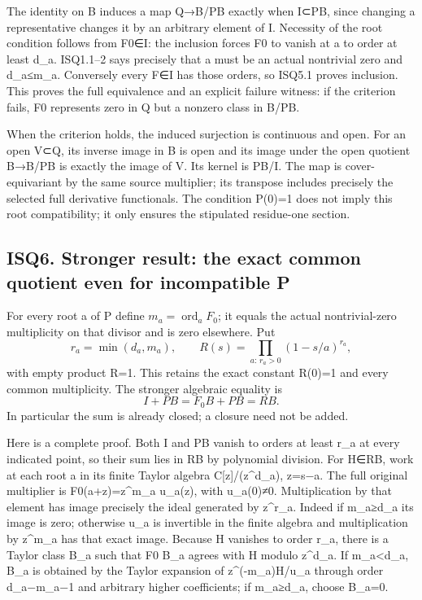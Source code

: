 \documentclass[
]{article}
\begin{document}
The identity on B induces a map Q→B/PB exactly when I⊂PB, since changing a representative changes it by an arbitrary element of I. Necessity of the root condition follows from F0∈I: the inclusion forces F0 to vanish at a to order at least d\_a. ISQ1.1--2 says precisely that a must be an actual nontrivial zero and d\_a≤m\_a. Conversely every F∈I has those orders, so ISQ5.1 proves inclusion. This proves the full equivalence and an explicit failure witness: if the criterion fails, F0 represents zero in Q but a nonzero class in B/PB.

When the criterion holds, the induced surjection is continuous and open. For an open V⊂Q, its inverse image in B is open and its image under the open quotient B→B/PB is exactly the image of V. Its kernel is PB/I. The map is cover-equivariant by the same source multiplier; its transpose includes precisely the selected full derivative functionals. The condition P(0)=1 does not imply this root compatibility; it only ensures the stipulated residue-one section.

\subsection{ISQ6. Stronger result: the exact common quotient even for incompatible P}\label{isq6.-stronger-result-the-exact-common-quotient-even-for-incompatible-p}

For every root a of P define \(m_a=\operatorname{ord}_aF_0\); it equals the actual nontrivial-zero multiplicity on that divisor and is zero elsewhere. Put \[
r_a=\min(d_a,m_a),\qquad
R(s)=\prod_{a:\,r_a>0}(1-s/a)^{r_a},
\tag{ISQ6.1}
\] with empty product R=1. This retains the exact constant R(0)=1 and every common multiplicity. The stronger algebraic equality is \[
\boxed{I+PB=F_0B+PB=RB.}
\tag{ISQ6.2}
\] In particular the sum is already closed; a closure need not be added.

Here is a complete proof. Both I and PB vanish to orders at least r\_a at every indicated point, so their sum lies in RB by polynomial division. For H∈RB, work at each root a in its finite Taylor algebra C{[}z{]}/(z\^{}d\_a), z=s−a. The full original multiplier is F0(a+z)=z\^{}m\_a u\_a(z), with u\_a(0)≠0. Multiplication by that element has image precisely the ideal generated by z\^{}r\_a. Indeed if m\_a≥d\_a its image is zero; otherwise u\_a is invertible in the finite algebra and multiplication by z\^{}m\_a has that exact image. Because H vanishes to order r\_a, there is a Taylor class B\_a such that F0 B\_a agrees with H modulo z\^{}d\_a. If m\_a\textless d\_a, B\_a is obtained by the Taylor expansion of z\^{}(-m\_a)H/u\_a through order d\_a−m\_a−1 and arbitrary higher coefficients; if m\_a≥d\_a, choose B\_a=0.
\end{document}
